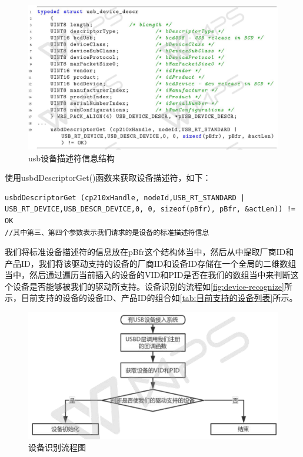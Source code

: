 \begin{figure}[!h]
\centering
\includegraphics[width=1.0\textwidth]{./graphics/usdbDescriptorGet.pdf}
\caption{usb设备描述符信息结构}\label{fig:usdbDescriptorGet}
\end{figure}

使用usbdDescriptorGet()函数来获取设备描述符，如下：\\
\lstset{language=C}
\begin{lstlisting}
usbdDescriptorGet (cp210xHandle, nodeId,USB_RT_STANDARD | USB_RT_DEVICE,USB_DESCR_DEVICE,0, 0, sizeof(pBfr), pBfr, &actLen)) != OK
//其中第三、第四个参数表示我们请求的是设备的标准描述符信息
\end{lstlisting}

	我们将标准设备描述符的信息放在pBfr这个结构体当中，然后从中提取厂商ID和产品ID，我们将该驱动支持的设备的厂商ID和设备ID存储在一个全局的二维数组当中，然后通过遍历当前插入的设备的VID和PID是否在我们的数组当中来判断这个设备是否能够被我们的驱动所支持。设备识别的流程如\autoref{fig:device-recognize}所示，目前支持的设备的设备ID、产品ID的组合如\autoref{tab:目前支持的设备列表}所示。
\begin{figure}[!h]
\centering
\includegraphics[width=.9\textwidth]{./graphics/device-recognize.pdf}
\caption{设备识别流程图}\label{fig:device-recognize}
\end{figure}

